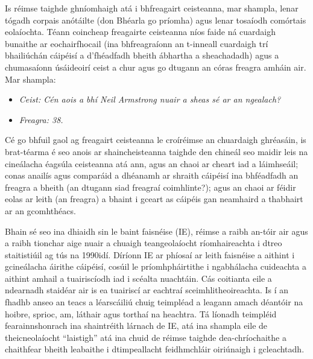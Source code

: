 \begin{multicols}{2}

Is réimse taighde ghníomhaigh atá i bhfreagairt ceisteanna, mar shampla, lenar tógadh corpais anótáilte (don Bhéarla go príomha) agus lenar tosaíodh comórtais eolaíochta. Téann coincheap freagairte ceisteanna níos faide ná cuardaigh bunaithe ar eochairfhocail (ina bhfreagraíonn an t-inneall cuardaigh trí bhailiúchán cáipéisí a d’fhéadfadh bheith ábhartha a sheachadadh) agus a chumasaíonn úsáideoirí ceist a chur agus go dtugann an córas freagra amháin air. Mar shampla:

\begin{itemize}
\item[] \textit{Ceist: Cén aois a bhí Neil Armstrong nuair a sheas sé ar an ngealach?}
\item[] \textit{Freagra: 38.}
\end{itemize}

Cé go bhfuil gaol ag freagairt ceisteanna le croíréimse an chuardaigh ghréasáin, is brat-téarma é seo anois ar shaincheisteanna taighde den chineál seo maidir leis na cineálacha éagsúla ceisteanna atá ann, agus an chaoi ar cheart iad a láimhseáil; conas anailís agus comparáid a dhéanamh ar shraith cáipéisí ina bhféadfadh an freagra a bheith (an dtugann siad freagraí coimhlinte?); agus an chaoi ar féidir eolas ar leith (an freagra) a bhaint i gceart as cáipéis gan neamhaird a thabhairt ar an gcomhthéacs. 

Bhain sé seo ina dhiaidh sin le baint faisnéise (IE), réimse a raibh an-tóir air agus a raibh tionchar aige nuair a chuaigh teangeolaíocht ríomhaireachta i dtreo staitistiúil ag tús na 1990idí. Díríonn IE ar phíosaí ar leith faisnéise a aithint i gcineálacha áirithe cáipéisí, cosúil le príomhpháirtithe i ngabhálacha cuideachta a aithint amhail a tuairiscíodh iad i scéalta nuachtáin. Cás coitianta eile a ndearnadh staidéar air is ea tuairiscí ar eachtraí sceimhlitheoireachta. Is í an fhadhb anseo an teacs a léarscáiliú chuig teimpléad a leagann amach déantóir na hoibre, sprioc, am, láthair agus torthaí na heachtra. Tá líonadh teimpléid fearainnshonrach ina shaintréith lárnach de IE, atá ina shampla eile de theicneolaíocht ``laistigh'' atá ina chuid de réimse taighde dea-chríochaithe a chaithfear bheith leabaithe i dtimpeallacht feidhmchláir oiriúnaigh i gcleachtadh.


\end{multicols}
